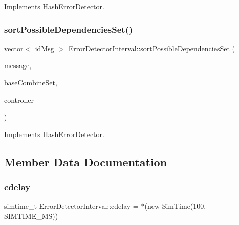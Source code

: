 Implements \hyperlink{classHashErrorDetector_ac0a25b9c1e27f98223869d11ca46d18f}{Hash\+Error\+Detector}.

\mbox{\label{classErrorDetectorInterval_abe98fbb4f13aeb919d2c2e8755f003ae}} 
\subsubsection{\texorpdfstring{sort\+Possible\+Dependencies\+Set()}{sortPossibleDependenciesSet()}}
{\footnotesize\ttfamily vector$<$ \hyperlink{structures_8h_a83a1d9a070efa5341da84cfd8e28d3e5}{id\+Msg} $>$ Error\+Detector\+Interval\+::sort\+Possible\+Dependencies\+Set (\begin{DoxyParamCaption}\item[{const \hyperlink{structures_8h_a7e7bdc1d2fff8a9436f2f352b2711ed6}{message\+Info} \&}]{message,  }\item[{const vector$<$ \hyperlink{structures_8h_a7e7bdc1d2fff8a9436f2f352b2711ed6}{message\+Info} $>$ \&}]{base\+Combine\+Set,  }\item[{\hyperlink{classController}{Controller} $\ast$}]{controller }\end{DoxyParamCaption})\hspace{0.3cm}{\ttfamily [virtual]}}



Implements \hyperlink{classHashErrorDetector_ad7419eaab728b7ed3e394d5aee9eda41}{Hash\+Error\+Detector}.



\subsection{Member Data Documentation}
\mbox{\label{classErrorDetectorInterval_adb614477095a1b9753f088f28776c677}} 
\subsubsection{\texorpdfstring{cdelay}{cdelay}}
{\footnotesize\ttfamily simtime\+\_\+t Error\+Detector\+Interval\+::cdelay = $\ast$(new Sim\+Time(100, S\+I\+M\+T\+I\+M\+E\+\_\+\+MS))\hspace{0.3cm}{\ttfamily [private]}}

